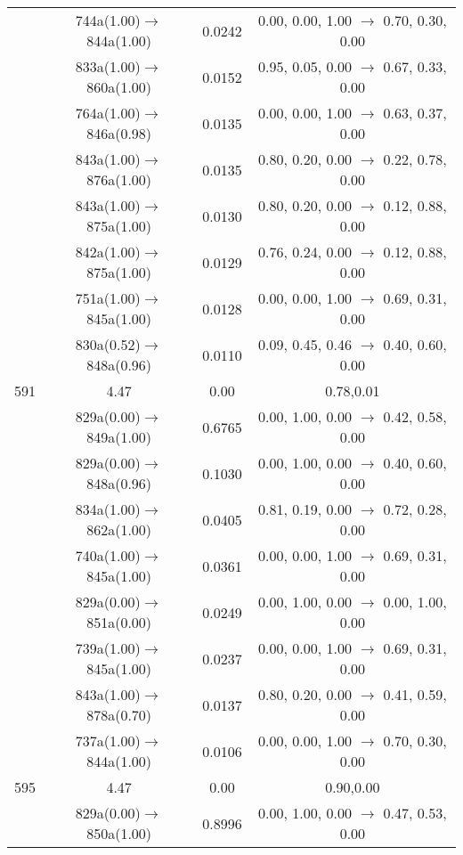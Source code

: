 \documentclass[10pt,a4paper]{article}
\begin{document}
\begin{longtable}{c|c|c|c}
 	& 744a(1.00)$\rightarrow$844a(1.00) &	 0.0242 &	 0.00, 0.00, 1.00 $\rightarrow$ 0.70, 0.30, 0.00 \\ 
 	& 833a(1.00)$\rightarrow$860a(1.00) &	 0.0152 &	 0.95, 0.05, 0.00 $\rightarrow$ 0.67, 0.33, 0.00 \\ 
 	& 764a(1.00)$\rightarrow$846a(0.98) &	 0.0135 &	 0.00, 0.00, 1.00 $\rightarrow$ 0.63, 0.37, 0.00 \\ 
 	& 843a(1.00)$\rightarrow$876a(1.00) &	 0.0135 &	 0.80, 0.20, 0.00 $\rightarrow$ 0.22, 0.78, 0.00 \\ 
 	& 843a(1.00)$\rightarrow$875a(1.00) &	 0.0130 &	 0.80, 0.20, 0.00 $\rightarrow$ 0.12, 0.88, 0.00 \\ 
 	& 842a(1.00)$\rightarrow$875a(1.00) &	 0.0129 &	 0.76, 0.24, 0.00 $\rightarrow$ 0.12, 0.88, 0.00 \\ 
 	& 751a(1.00)$\rightarrow$845a(1.00) &	 0.0128 &	 0.00, 0.00, 1.00 $\rightarrow$ 0.69, 0.31, 0.00 \\ 
 	& 830a(0.52)$\rightarrow$848a(0.96) &	 0.0110 &	 0.09, 0.45, 0.46 $\rightarrow$ 0.40, 0.60, 0.00 \\ 
 \hline591 &	 4.47 &	 0.00 &	 0.78,0.01 \\ 
  	& 829a(0.00)$\rightarrow$849a(1.00) &	 0.6765 &	 0.00, 1.00, 0.00 $\rightarrow$ 0.42, 0.58, 0.00 \\ 
 	& 829a(0.00)$\rightarrow$848a(0.96) &	 0.1030 &	 0.00, 1.00, 0.00 $\rightarrow$ 0.40, 0.60, 0.00 \\ 
 	& 834a(1.00)$\rightarrow$862a(1.00) &	 0.0405 &	 0.81, 0.19, 0.00 $\rightarrow$ 0.72, 0.28, 0.00 \\ 
 	& 740a(1.00)$\rightarrow$845a(1.00) &	 0.0361 &	 0.00, 0.00, 1.00 $\rightarrow$ 0.69, 0.31, 0.00 \\ 
 	& 829a(0.00)$\rightarrow$851a(0.00) &	 0.0249 &	 0.00, 1.00, 0.00 $\rightarrow$ 0.00, 1.00, 0.00 \\ 
 	& 739a(1.00)$\rightarrow$845a(1.00) &	 0.0237 &	 0.00, 0.00, 1.00 $\rightarrow$ 0.69, 0.31, 0.00 \\ 
 	& 843a(1.00)$\rightarrow$878a(0.70) &	 0.0137 &	 0.80, 0.20, 0.00 $\rightarrow$ 0.41, 0.59, 0.00 \\ 
 	& 737a(1.00)$\rightarrow$844a(1.00) &	 0.0106 &	 0.00, 0.00, 1.00 $\rightarrow$ 0.70, 0.30, 0.00 \\ 
 \hline595 &	 4.47 &	 0.00 &	 0.90,0.00 \\ 
  	& 829a(0.00)$\rightarrow$850a(1.00) &	 0.8996 &	 0.00, 1.00, 0.00 $\rightarrow$ 0.47, 0.53, 0.00 \\ 

\end{longtable}
\end{document}
